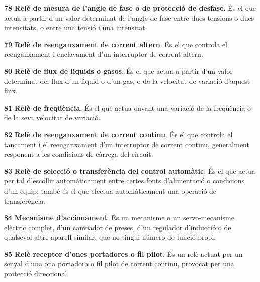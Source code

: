 \begin{multicols}{2}
\begin{list}{}
\item[\textbf{78}]  \textbf{Rel\`{e} de  mesura de l'angle de fase o de protecci\'{o}
de desfase}. \'{E}s el que actua a partir d'un valor determinat de
l'angle de fase entre dues tensions o dues intensitats, o entre una
tensi\'{o} i una intensitat.

\item[\textbf{79}]  \textbf{Rel\`{e} de
reenganxament de corrent altern}. \'{E}s el que controla el reenganxament i enclavament d'un
interruptor de corrent altern.

\item[\textbf{80}]  \textbf{Rel\`{e} de flux de l\'{\i}quids
o gasos}.
 \'{E}s el que actua a partir d'un valor determinat del flux d'un l\'{\i}quid o d'un gas, o de
 la  velocitat de variaci\'{o} d'aquest flux.

\item[\textbf{81}]  \textbf{Rel\`{e} de freq\"{u}\`{e}ncia}. \'{E}s el que actua
davant una variaci\'{o} de la freq\"{u}\`{e}ncia o de la seva velocitat de variaci\'{o}.

\item[\textbf{82}]  \textbf{Rel\`{e} de
reenganxament de corrent continu}. \'{E}s el que controla el tancament i el reenganxament d'un
interruptor de corrent continu, generalment responent a les condicions de c\`{a}rrega del
circuit.

\item[\textbf{83}] 
\textbf{Rel\`{e} de selecci\'{o} o transfer\`{e}ncia del control autom\`{a}tic}. \'{E}s
el que actua per tal d'escollir autom\`{a}ticament entre certes fonts
d'alimentaci\'{o} o condicions d'un equip; tamb\'{e} \'{e}s el que efectua
autom\`{a}ticament una operaci\'{o} de transfer\`{e}ncia.

\item[\textbf{84}]  \textbf{Mecanisme d'accionament}. \'{E}s un
mecanisme o un servo-mecanisme el\`{e}ctric complet,  d'un canviador de
preses, d'un regulador d'inducci\'{o} o de qualsevol altre aparell
similar, que no tingui n\'{u}mero de funci\'{o} propi.

\item[\textbf{85}]  \textbf{Rel\`{e}
receptor d'ones portadores o fil pilot}. \'{E}s un rel\`{e} actuat per un
senyal d'una ona portadora o fil pilot de corrent continu, provocat
per una protecci\'{o} direccional.


\end{list}
\end{multicols}
